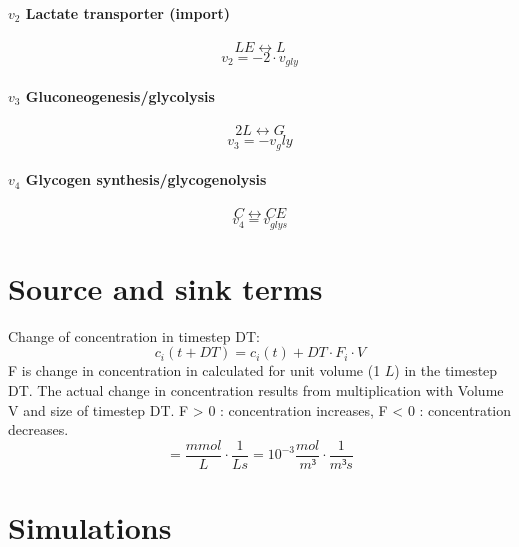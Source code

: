 \begin{landscape}
\begin{multicols}{2}
\paragraph{$v_2$ Lactate transporter (import)}
\[ LE \leftrightarrow L \]
\begin{equation}
v_2 = - 2 \cdot v_{gly}
\label{eq: v2}
\end{equation}

\paragraph{$v_3$ Gluconeogenesis/glycolysis}
\[ 2 L \leftrightarrow G \]
\begin{equation}
v_3 = -v_gly
\label{eq: v3}
\end{equation}

\paragraph{$v_4$ Glycogen synthesis/glycogenolysis}
\[ C \leftrightarrow CE \]
\begin{equation}
v_4 = v_{glys}
\label{eq: v4}
\end{equation}

\end{multicols}
\end{landscape}

\section{Source and sink terms}
Change of concentration in timestep DT:
\begin{equation}
 c_i(t+DT) = c_i(t) + DT \cdot F_i \cdot V
\end{equation}
F is change in concentration in calculated for unit volume (1 $L$) in the timestep DT. The actual change in concentration results from multiplication with Volume V and size of timestep DT. F > 0 : concentration increases, F < 0 : concentration decreases.
\begin{equation}
 [F] = \frac{\unit{mmol}}{\unit{L}} \cdot \frac{1}{\unit{Ls}} = 10^{-3} \frac{\unit{mol}}{\unit{m³}} \cdot \frac{1}{\unit{m³s}}
\end{equation}


\section{Simulations}
\label{sec: simulations}
 
